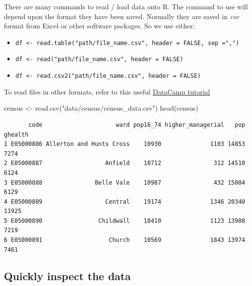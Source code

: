 \documentclass[
  letterpaper,
  DIV=11,
  numbers=noendperiod,
  oneside]{scrreprt}
\newenvironment{Shaded}{\begin{snugshade}}{\end{snugshade}}
\newcommand{\FunctionTok}[1]{\textcolor[rgb]{0.28,0.35,0.67}{#1}}
\newcommand{\NormalTok}[1]{\textcolor[rgb]{0.00,0.23,0.31}{#1}}
\newcommand{\OtherTok}[1]{\textcolor[rgb]{0.00,0.23,0.31}{#1}}
\newcommand{\StringTok}[1]{\textcolor[rgb]{0.13,0.47,0.30}{#1}}
\providecommand{\tightlist}{%
  \setlength{\itemsep}{0pt}\setlength{\parskip}{0pt}}\usepackage{longtable,booktabs,array}
\begin{document}
There are many commands to read / load data onto R. The command to use
will depend upon the format they have been saved. Normally they are
saved in \emph{csv} format from Excel or other software packages. So we
use either:

\begin{itemize}
\tightlist
\item
  \texttt{df\ \textless{}-\ read.table("path/file\_name.csv",\ header\ =\ FALSE,\ sep\ =",")}
\item
  \texttt{df\ \textless{}-\ read("path/file\_name.csv",\ header\ =\ FALSE)}
\item
  \texttt{df\ \textless{}-\ read.csv2("path/file\_name.csv",\ header\ =\ FALSE)}
\end{itemize}

To read files in other formats, refer to this useful
\href{https://www.datacamp.com/community/tutorials/r-data-import-tutorial?utm_source=adwords_ppc&utm_campaignid=1655852085&utm_adgroupid=61045434382&utm_device=c&utm_keyword=\%2Bread\%20\%2Bdata\%20\%2Br&utm_matchtype=b&utm_network=g&utm_adpostion=1t1&utm_creative=318880582308&utm_targetid=kwd-309793905111&utm_loc_interest_ms=&utm_loc_physical_ms=9046551&gclid=CjwKCAiA3uDwBRBFEiwA1VsajJO0QK0Jg7VipIt8_t82qQrnUliI0syAlh8CIxnE76Rb0kh3FbiehxoCzCgQAvD_BwE\#csv}{DataCamp
tutorial}

\begin{Shaded}
\begin{Highlighting}[]
\NormalTok{census }\OtherTok{\textless{}{-}} \FunctionTok{read.csv}\NormalTok{(}\StringTok{"data/census/census\_data.csv"}\NormalTok{)}
\FunctionTok{head}\NormalTok{(census)}
\end{Highlighting}
\end{Shaded}

\begin{verbatim}
       code                     ward pop16_74 higher_managerial   pop ghealth
1 E05000886 Allerton and Hunts Cross    10930              1103 14853    7274
2 E05000887                  Anfield    10712               312 14510    6124
3 E05000888               Belle Vale    10987               432 15004    6129
4 E05000889                  Central    19174              1346 20340   11925
5 E05000890                Childwall    10410              1123 13908    7219
6 E05000891                   Church    10569              1843 13974    7461
\end{verbatim}

\subsection{Quickly inspect the data}\label{quickly-inspect-the-data}
\end{document}
